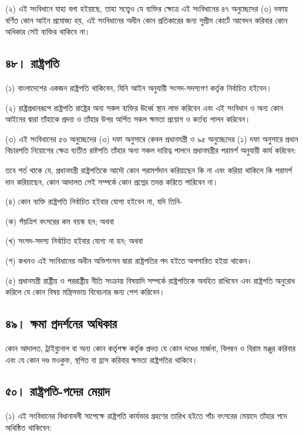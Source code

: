 \documentclass[11pt]{article}
\begin{document}
(২) এই সংবিধানে যাহা বলা হইয়াছে, তাহা সত্ত্বেও যে ব্যক্তির ক্ষেত্রে এই
    সংবিধানের ৪৭ অনুচ্ছেদের (৩) দফায় বর্ণিত কোন আইন প্রযোজ্য হয়, এই সংবিধানের
    অধীন কোন প্রতিকারের জন্য সুপ্রীম কোর্টে আবেদন করিবার কোন অধিকার সেই ব্যক্তির
    থাকিবে না।

\subsection{৪৮। রাষ্ট্রপতি}
\label{sec:orgf3c4238}
(১) বাংলাদেশের একজন রাষ্ট্রপতি থাকিবেন, যিনি আইন অনুযায়ী সংসদ-সদস্যগণ
     কর্তৃক নির্বাচিত হইবেন।

(২) রাষ্ট্রপ্রধানরূপে রাষ্ট্রপতি রাষ্ট্রের অন্য সকল ব্যক্তির ঊর্ধ্বে স্থান লাভ
    করিবেন এবং এই সংবিধান ও অন্য কোন আইনের দ্বারা তাঁহাকে প্রদত্ত ও তাঁহার উপর
    অর্পিত সকল ক্ষমতা প্রয়োগ ও কর্তব্য পালন করিবেন।

(৩) এই সংবিধানের ৫৬ অনুচ্ছেদের (৩) দফা অনুসারে কেবল প্রধানমন্ত্রী ও ৯৫
    অনুচ্ছেদের (১) দফা অনুসারে প্রধান বিচারপতি নিয়োগের ক্ষেত্র ব্যতীত রাষ্টপতি
    তাঁহার অন্য সকল দায়িত্ব পালনে প্রধানমন্ত্রীর পরামর্শ অনুযায়ী কার্য করিবেন:

তবে শর্ত থাকে যে, প্রধানমন্ত্রী রাষ্ট্রপতিকে আদৌ কোন পরামর্শদান করিয়াছেন কি
না এবং করিয়া থাকিলে কি পরামর্শ দান করিয়াছেন, কোন আদালত সেই সম্পর্কে কোন
প্রশ্নের তদন্ত করিতে পারিবেন না।

(৪) কোন ব্যক্তি রাষ্ট্রপতি নির্বাচিত হইবার যোগ্য হইবেন না, যদি তিনি-

(ক) পঁয়ত্রিশ বৎসরের কম বয়স্ক হন; অথবা

(খ) সংসদ-সদস্য নির্বাচিত হইবার যোগ্য না হন; অথবা

(গ) কখনও এই সংবিধানের অধীন অভিশংসন দ্বারা রাষ্ট্রপতির পদ হইতে অপসারিত
    হইয়া থাকেন।

(৫) প্রধানমন্ত্রী রাষ্ট্রীয় ও পররাষ্ট্রীয় নীতি সংক্রান্ত বিষয়াদি সম্পর্কে
    রাষ্ট্রপতিকে অবহিত রাখিবেন এবং রাষ্ট্রপতি অনুরোধ করিলে যে কোন বিষয়
    মন্ত্রিসভায় বিবেচনার জন্য পেশ করিবেন।

\subsection{৪৯। ক্ষমা প্রদর্শনের অধিকার}
\label{sec:org0e6ad71}
কোন আদালত, ট্রাইব্যুনাল বা অন্য কোন কর্তৃপক্ষ কর্তৃক প্রদত্ত যে কোন দণ্ডের
মার্জনা, বিলম্বন ও বিরাম মঞ্জুর করিবার এবং যে কোন দণ্ড মওকুফ, স্থগিত বা হ্রাস
করিবার ক্ষমতা রাষ্ট্রপতির থাকিবে।

\subsection{৫০। রাষ্ট্রপতি-পদের মেয়াদ}
\label{sec:orgb65fbc1}
(১) এই সংবিধানের বিধানাবলী সাপেক্ষে রাষ্ট্রপতি কার্যভার গ্রহণের তারিখ হইতে
    পাঁচ বৎসরের মেয়াদে তাঁহার পদে অধিষ্ঠিত থাকিবেন:
\end{document}
